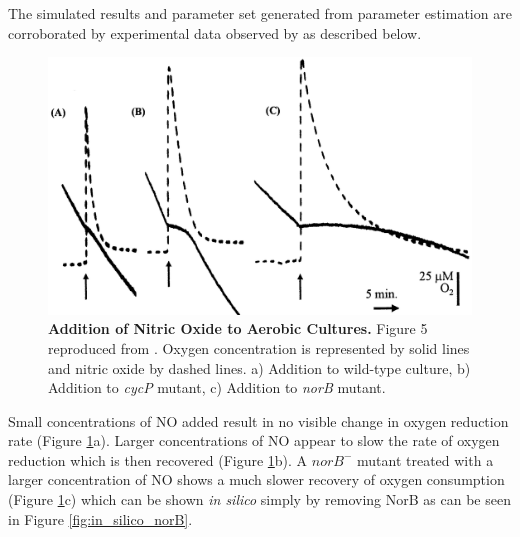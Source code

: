 The simulated results and parameter set generated from parameter estimation are corroborated by experimental data observed by \citet{Anjum2002} as described below.

\begin{figure}[tbp]
 \centering
 \includegraphics[width=14cm]{./06-noreduction/data/F5.png}
 \caption[{Addition of Nitric Oxide to Aerobic Cultures.}]{{\bf Addition of Nitric Oxide to Aerobic Cultures.} Figure 5 reproduced from \citet{Anjum2002}. Oxygen concentration is represented by solid lines and nitric oxide by dashed lines. a) Addition to wild-type culture, b) Addition to \textit{cycP} mutant, c) Addition to \textit{norB} mutant.
  \label{fig:anjum}}
\end{figure}


Small concentrations of NO added result in no visible change in oxygen reduction rate (Figure \ref{fig:anjum}a). Larger concentrations of NO appear to slow the rate of oxygen reduction which is then recovered (Figure \ref{fig:anjum}b). A $norB^-$ mutant treated with a larger concentration of NO shows a much slower recovery of oxygen consumption (Figure \ref{fig:anjum}c) which can be shown \textit{in silico} simply by removing NorB as can be seen in Figure \ref{fig:in_silico_norB}.

